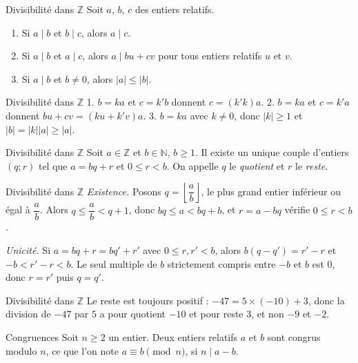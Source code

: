 \documentclass[aspectratio=169,10pt]{beamer}
\providecommand{\N}{\mathbb{N}}
\providecommand{\Z}{\mathbb{Z}}
\providecommand{\abs}[1]{\left\lvert #1\right\rvert}
\begin{document}
\begin{frame}{Divisibilité dans \(\Z\)}
Soit \(a\), \(b\), \(c\) des entiers relatifs.

\begin{enumerate}
\setcounter{enumi}{0}
\item Si \(a\mid b\) et \(b\mid c\), alors \(a\mid c\).

\item Si \(a\mid b\) et \(a\mid c\), alors \(a\mid bu+cv\) pour tous entiers relatifs \(u\) et \(v\).

\item Si \(a\mid b\) et \(b\neq0\), alors \(\abs a\le\abs b\).

\end{enumerate}
\end{frame}
\begin{frame}{Divisibilité dans \(\Z\)}
1. \(b=ka\) et \(c=k'b\) donnent \(c=(k'k)a\). 2. \(b=ka\) et \(c=k'a\) donnent \(bu+cv=(ku+k'v)a\). 3. \(b=ka\) avec \(k\neq0\), donc \(\abs k\ge1\) et \(\abs b=\abs k\abs a\ge\abs a\).
\end{frame}
\begin{frame}{Divisibilité dans \(\Z\)}
Soit \(a\in\Z\) et \(b\in\N\), \(b\ge1\). Il existe un unique couple d'entiers \((q;r)\) tel que \(a=bq+r\) et \(0\le r<b\). On appelle \(q\) le \emph{quotient} et \(r\) le \emph{reste}.
\end{frame}
\begin{frame}{Divisibilité dans \(\Z\)}
\emph{Existence.} Posons \(q=\left\lfloor\dfrac ab\right\rfloor\), le plus grand entier inférieur ou égal à \(\dfrac ab\). Alors \(q\le\dfrac ab<q+1\), donc \(bq\le a<bq+b\), et \(r=a-bq\) vérifie \(0\le r<b\).

\emph{Unicité.} Si \(a=bq+r=bq'+r'\) avec \(0\le r,r'<b\), alors \(b(q-q')=r'-r\) et \(-b<r'-r<b\). Le seul multiple de \(b\) strictement compris entre \(-b\) et \(b\) est \(0\), donc \(r=r'\) puis \(q=q'\).
\end{frame}
\begin{frame}{Divisibilité dans \(\Z\)}
Le reste est toujours positif : \(-47=5\times(-10)+3\), donc la division de \(-47\) par \(5\) a pour quotient \(-10\) et pour reste \(3\), et non \(-9\) et \(-2\).
\end{frame}
\begin{frame}{Congruences}
Soit \(n\ge2\) un entier. Deux entiers relatifs \(a\) et \(b\) sont congrus modulo \(n\), ce que l'on note \(a\equiv b\pmod n\), si \(n\mid a-b\).
\end{frame}
\end{document}
